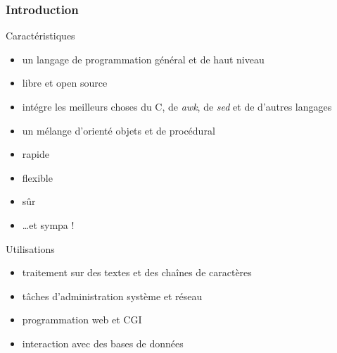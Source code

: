 \begin{frame}
  \frametitle{Introduction}

  \begin{block}{Caractéristiques}
    \begin{itemize}
      \item un langage de programmation général et de haut niveau
      \item libre et open source
      \item intégre les meilleurs choses du C, de \textit{awk}, de \textit{sed}
        et de d'autres langages
      \item un mélange d'orienté objets et de procédural
      \item rapide
      \item flexible
      \item sûr
      \item \ldots et sympa !
    \end{itemize}
  \end{block}

  \begin{exampleblock}{Utilisations}
    \begin{itemize}
      \item traitement sur des textes et des chaînes de caractères
      \item tâches d'administration système et réseau
      \item programmation web et CGI
      \item interaction avec des bases de données
    \end{itemize}
  \end{exampleblock}

\end{frame}

